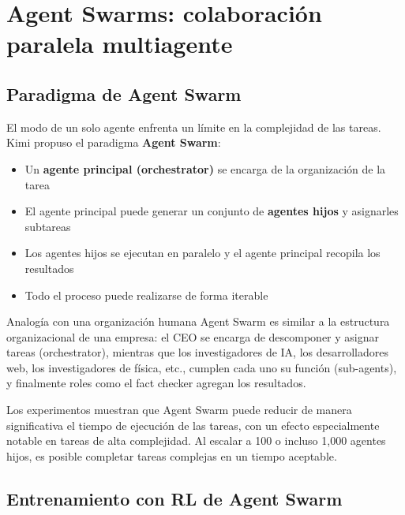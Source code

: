 \section{Agent Swarms: colaboración paralela multiagente}

\subsection{Paradigma de Agent Swarm}

El modo de un solo agente enfrenta un límite en la complejidad de las tareas. Kimi propuso el paradigma \textbf{Agent Swarm}:

\begin{itemize}
    \item Un \textbf{agente principal (orchestrator)} se encarga de la organización de la tarea
    \item El agente principal puede generar un conjunto de \textbf{agentes hijos} y asignarles subtareas
    \item Los agentes hijos se ejecutan en paralelo y el agente principal recopila los resultados
    \item Todo el proceso puede realizarse de forma iterable
\end{itemize}

\begin{knowledgebox}{Analogía con una organización humana}
Agent Swarm es similar a la estructura organizacional de una empresa: el CEO se encarga de descomponer y asignar tareas (orchestrator), mientras que los investigadores de IA, los desarrolladores web, los investigadores de física, etc., cumplen cada uno su función (sub-agents), y finalmente roles como el fact checker agregan los resultados.
\end{knowledgebox}

Los experimentos muestran que Agent Swarm puede reducir de manera significativa el tiempo de ejecución de las tareas, con un efecto especialmente notable en tareas de alta complejidad. Al escalar a 100 o incluso 1,000 agentes hijos, es posible completar tareas complejas en un tiempo aceptable.

\subsection{Entrenamiento con RL de Agent Swarm}

